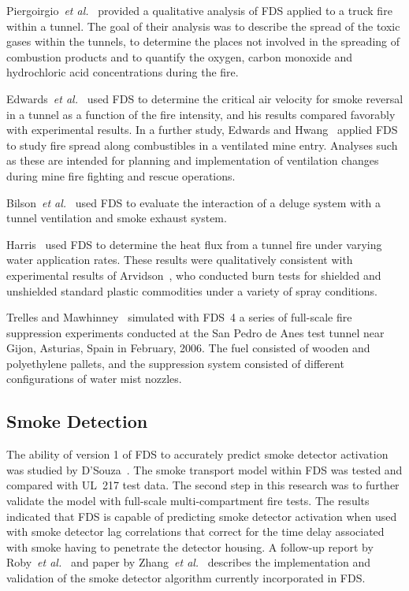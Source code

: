 Piergoirgio~{\em et al.}~\cite{Piergiorgio:1} provided a qualitative analysis of FDS applied to a truck fire within a tunnel. The goal of their analysis was to describe the spread of the toxic gases within the tunnels, to determine the places not involved in the spreading of combustion products and to quantify the oxygen, carbon monoxide and hydrochloric acid concentrations during the fire.

Edwards~{\em et al.}~\cite{Edwards:SME2005,Edwards:FSJ} used FDS to determine the critical air velocity for smoke reversal in a tunnel as a function of the fire intensity, and his results compared favorably with  experimental results.  In a  further study,  Edwards and Hwang~\cite{Edwards:SME2006} applied FDS to study fire spread along combustibles in a ventilated mine entry. Analyses such as these are intended for planning and implementation of ventilation changes during mine fire fighting and rescue operations.

Bilson~{\em et al.}~\cite{Bilson:2008} used FDS to evaluate the interaction of a deluge system with a tunnel ventilation and smoke exhaust system.

Harris~\cite{Harris:ISTSS2010} used FDS to determine the heat flux from a tunnel fire under varying water application rates. These results were qualitatively consistent with experimental results of Arvidson~\cite{Arvidson:ISTSS2010}, who conducted burn tests for shielded and unshielded standard plastic commodities under a variety of spray conditions.

Trelles and Mawhinney~\cite{Trelles:JFPE2010,Mawhinney:FT2012} simulated with FDS~4 a series of full-scale fire suppression experiments conducted at the San Pedro de Anes test tunnel near Gijon, Asturias, Spain in February, 2006. The fuel consisted of wooden and polyethylene pallets, and the suppression system consisted of different configurations of water mist nozzles.




\subsection{Smoke Detection}

The ability of version 1 of FDS to accurately predict smoke detector activation was studied by D'Souza~\cite{DSouza:1}. The smoke transport model within FDS was tested and compared with UL~217 test data. The second step in this research was to further validate the model with full-scale multi-compartment fire tests. The results indicated that FDS is capable of predicting smoke detector activation when used with smoke detector lag correlations that correct for the time delay associated with smoke having to penetrate the detector housing. A follow-up report by Roby~{\em et al.}~\cite{CSE_GCR} and paper by Zhang~{\em et al.}~\cite{Zhang:FSJ2008} describes the implementation and validation of the smoke detector algorithm currently incorporated in FDS.

